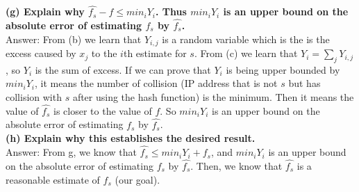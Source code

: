 \documentclass{article}
\begin{document}
\textbf{(g) Explain why $\hat{f_{s}} - f \leq min_i Y_i$. Thus $min_i Y_i$ is an upper bound on the absolute error of estimating $f_s$ by $\hat{f_{s}}$.} \\ \newline
Answer: From (b) we learn that $Y_{i,j}$ is a random variable which is the is the excess caused by $x_j$ to the $i$th estimate for $s$. From (c) we learn that $Y_i = \sum_jY_{i,j}$, so $Y_i$ is the sum of excess. If we can prove that $Y_i$ is being upper bounded by $min_i Y_i$, it means the number of collision (IP address that is not $s$ but has collision with $s$ after using the hash function) is the minimum. Then it means the value of $\hat{f_{s}}$ is closer to the value of $f$. So $min_i Y_i$ is an upper bound on the absolute error of estimating $f_s$ by $\hat{f_{s}}$.\\ \newline
\textbf{(h) Explain why this establishes the desired result.} \\ \newline
Answer: From g, we know that $\hat{f_{s}}  \leq min_i Y_i + f_{s}$, and $ min_i Y_i$ is an upper bound on the absolute error of estimating $ f_{s}$ by  $\hat{f_{s}}$. Then, we know that  $\hat{f_{s}}$ is a reasonable estimate of $ f_{s}$ (our goal).
\end{document}
